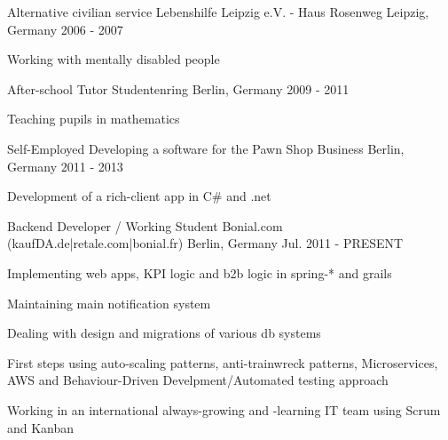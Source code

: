 


\begin{cventries}


\cventry
{Alternative civilian service} %
{Lebenshilfe Leipzig e.V. - Haus Rosenweg} %
{Leipzig, Germany} %
{2006 - 2007} %
{ %
\begin{cvitems}
\item {Working with mentally disabled people}
\end{cvitems}
}

\cventry
{After-school Tutor} %
{Studentenring} %
{Berlin, Germany} %
{2009 - 2011} %
{ %
\begin{cvitems}
\item {Teaching pupils in mathematics}
\end{cvitems}
}

\cventry
{Self-Employed} %
{Developing a software for the Pawn Shop Business} %
{Berlin, Germany} %
{2011 - 2013} %
{ %
\begin{cvitems}
\item {Development of a rich-client app in C\# and .net}
\end{cvitems}
}

\cventry
{Backend Developer / Working Student} %
{Bonial.com (kaufDA.de|retale.com|bonial.fr)} %
{Berlin, Germany} %
{Jul. 2011 - PRESENT} %
{ %
\begin{cvitems}
\item {Implementing web apps, KPI logic and b2b logic in spring-* and grails}
\item {Maintaining main notification system}
\item {Dealing with design and migrations of various db systems}
\item {First steps using auto-scaling patterns, anti-trainwreck patterns, Microservices, AWS and Behaviour-Driven Develpment/Automated testing approach}
\item {Working in an international always-growing and -learning IT team using Scrum and Kanban}
\end{cvitems}
}



\end{cventries}